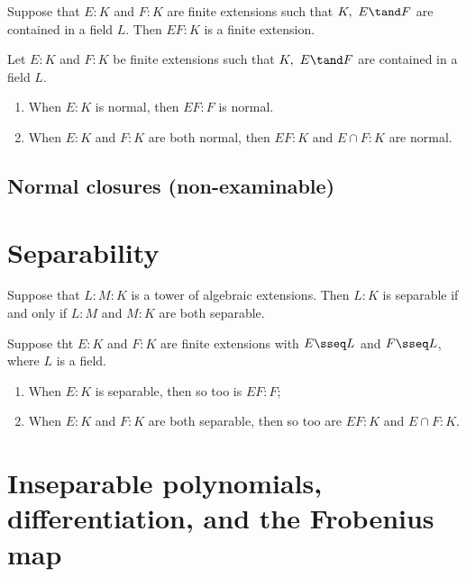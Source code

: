 \documentclass[a4paper]{article}
\begin{document}
\begin{tproposition}
  Suppose that \( E:K \) and \( F:K \) are finite extensions such that \( K,\ E\tand F \) are contained in a field \( L \).
  Then \( EF:K \) is a finite extension.
\end{tproposition}

\begin{ttheorem}
  Let \( E:K \) and \( F:K \) be finite extensions such that \( K,\ E\tand F \) are contained in a field \( L \). \begin{enumerate}[label=(\alph*)]
    \item When \( E:K \) is normal, then \( EF:F \) is normal.
    \item When \( E:K \) and \( F:K \) are both normal, then \( EF:K \) and \( E\cap F:K \) are normal.
  \end{enumerate}
\end{ttheorem}

\subsection{Normal closures (non-examinable)}

\section{Separability} %
\setcounter{tdefinition}{24}

\begin{ttheorem}
  Suppose that \( L:M:K \) is a tower of algebraic extensions.
  Then \( L:K \) is separable if and only if \( L:M \) and \( M:K \) are both separable.
\end{ttheorem}

\begin{ttheorem}
  Suppose tht \( E:K \) and \( F:K \) are finite extensions with \( E\sseq L \) and \( F\sseq L \), where \( L \) is a field.
  \begin{enumerate}[label=(\alph*)]
    \item When \( E:K \) is separable, then so too is \( EF:F \);
    \item When \( E:K \) and \( F:K \) are both separable, then so too are \( EF:K \) and \( E\cap F:K \).
  \end{enumerate}
\end{ttheorem}

\section{Inseparable polynomials, differentiation, and the Frobenius map}
\end{document}
